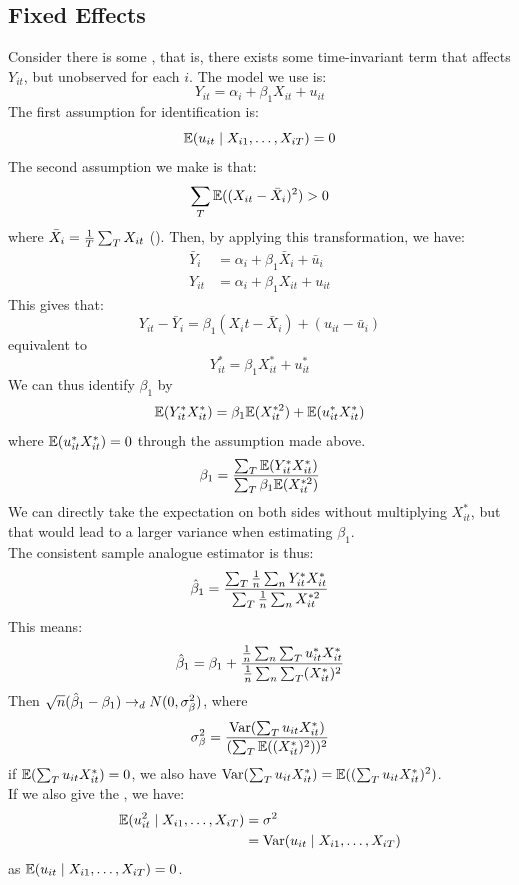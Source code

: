 \subsection{Fixed Effects}
Consider there is some , that is, there exists some time-invariant term that affects $Y_{it}$, but unobserved for each $i$. The model we use is:
$$Y_{it} = \alpha_i + \beta_1 X_{it} + u_{it}$$
The first assumption for identification is:
$$\mathbb{E}(u_{it} \mid X_{i1}, \dots, X_{iT}) = 0$$
The second assumption we make is that:
$$\sum_{T} \mathbb{E}((X_{it} - \bar{X}_i)^2) > 0$$
where $\bar{X}_i = \frac{1}{T}\sum_{T} X_{it}$ (). Then, by applying this transformation, we have:
\begin{align*}
    \bar{Y}_i &= \alpha_i + \beta_1 \bar{X}_i + \bar{u}_i \\
    Y_{it} &= \alpha_i + \beta_1 X_{it} + u_{it}
\end{align*}
This gives that:
$$Y_{it} - \bar{Y}_i = \beta_1 (X_it - \bar{X}_i) + (u_{it} - \bar{u}_i)$$
equivalent to
$$Y_{it}^* = \beta_1 X_{it}^* + u_{it}^*$$
We can thus identify $\beta_1$ by
$$\mathbb{E}(Y_{it}^*X_{it}^*) = \beta_1\mathbb{E}(X_{it}^{*2}) + \mathbb{E}(u_{it}^*X_{it}^*)$$
where $\mathbb{E}(u_{it}^*X_{it}^*) = 0$ through the assumption made above.
$$\beta_1 = \frac{\sum_{T}\mathbb{E}(Y_{it}^*X_{it}^*)}{\sum_{T}\beta_1\mathbb{E}(X_{it}^{*2})}$$
We can directly take the expectation on both sides without multiplying $X_{it}^*$, but that would lead to a larger variance when estimating $\beta_1$. \\
The consistent sample analogue estimator is thus:
$$\hat{\beta}_1 = \frac{\sum_{T}\frac{1}{n}\sum_{n}Y_{it}^*X_{it}^*}{\sum_{T}\frac{1}{n}\sum_{n}X_{it}^{*2}}$$
This means:
$$\hat{\beta}_1 = \beta_1 + \frac{\frac{1}{n}\sum_{n}\sum_{T}u_{it}^*X_{it}^*}{\frac{1}{n}\sum_{n}\sum_{T}(X_{it}^*)^2}$$
Then $\sqrt{n}(\hat{\beta}_1 - \beta_1) \to_d N(0, \sigma_\beta^2)$, where
$$\sigma_\beta^2 = \frac{\text{Var}(\sum_{T} u_{it}X_{it}^*)}{(\sum_{T}\mathbb{E}((X_{it}^*)^2))^2}$$
if $\mathbb{E}(\sum_{T}u_{it}X_{it}^*) = 0$, we also have $\text{Var}(\sum_{T} u_{it}X_{it}^*) = \mathbb{E}((\sum_{T}u_{it}X_{it}^*)^2)$. \\
If we also give the , we have:
\begin{align*}
    \mathbb{E}(u_{it}^2 \mid X_{i1}, \dots, X_{iT}) &= \sigma^2 \\
    &= \text{Var}(u_{it} \mid X_{i1}, \dots, X_{iT})
\end{align*}
as $\mathbb{E}(u_{it} \mid X_{i1}, \dots, X_{iT}) = 0$. \\
